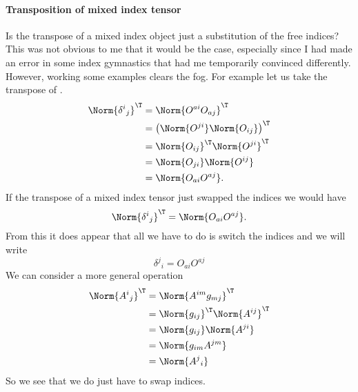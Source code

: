 \paragraph{Transposition of mixed index tensor}
%
Is the transpose of a mixed index object just a substitution of the free indices?  This was not obvious to me that it would be the case, especially since I had made an error in some index gymnastics that had me temporarily convinced differently.  However, working some examples clears the fog.  For example let us take the transpose of .
%
\begin{equation}\label{eqn:relativisticElectrodynamicsL11b:1440}
\begin{aligned}
\Norm{ {\delta^i}_j }^\T
&=
\Norm{ O^{a i} O_{a j} }^\T \\
&=
\left( \Norm{ O^{j i} } \Norm{ O_{i j} } \right)^\T \\
&=
\Norm{ O_{i j} }^\T
\Norm{ O^{j i} }^\T  \\
&=
\Norm{ O_{j i} }
\Norm{ O^{i j} } \\
&=
\Norm{ O_{a i} O^{a j} }.
\end{aligned}
\end{equation}
%
If the transpose of a mixed index tensor just swapped the indices we would have
%
\begin{equation}\label{eqn:relativisticElectrodynamicsL11:1060}
\Norm{ {\delta^i}_j }^\T = \Norm{ O_{a i} O^{a j} }.
\end{equation}
From this it does appear that all we have to do is switch the indices and we will write
\begin{equation}\label{eqn:relativisticElectrodynamicsL11:1060b}
{\delta^j}_i = O_{a i} O^{a j}
\end{equation}
%
We can consider a more general operation
%
\begin{equation}\label{eqn:relativisticElectrodynamicsL11b:1460}
\begin{aligned}
\Norm{{A^i}_j}^\T
&=
\Norm{ A^{i m} g_{m j} }^\T \\
&=
\Norm{ g_{i j} }^\T
\Norm{ A^{i j} }^\T
 \\
&=
\Norm{ g_{i j} }
\Norm{ A^{j i} }
 \\
&=
\Norm{ g_{i m} A^{j m} }
 \\
&=
\Norm{ {A^{j}}_i }
\end{aligned}
\end{equation}
%
So we see that we do just have to swap indices.


